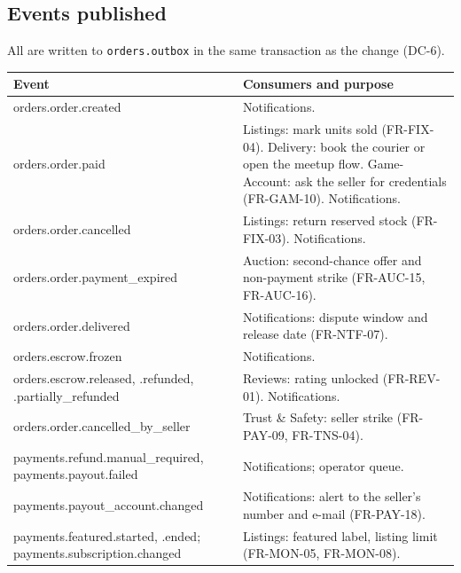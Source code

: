 \documentclass[11pt,a4paper]{article}
\newenvironment{dtable}[1]{\small\begin{longtable}{#1}}{\end{longtable}}
\begin{document}
\subsection{Events published}
All are written to \texttt{orders.outbox} in the same transaction as the change (DC-6).
\begin{dtable}{@{}>{\ttfamily}p{6.0cm}>{\raggedright\arraybackslash}p{9.2cm}@{}}
\toprule
\textnormal{\textbf{Event}} & \textbf{Consumers and purpose} \\ \midrule \endhead
orders.order.created & Notifications. \\
orders.order.paid & Listings: mark units sold (FR-FIX-04). Delivery: book the courier or open the meetup flow. Game-Account: ask the seller for credentials (FR-GAM-10). Notifications. \\
orders.order.cancelled & Listings: return reserved stock (FR-FIX-03). Notifications. \\
orders.order.\allowbreak payment\_expired & Auction: second-chance offer and non-payment strike (FR-AUC-15, FR-AUC-16). \\
orders.order.delivered & Notifications: dispute window and release date (FR-NTF-07). \\
orders.escrow.frozen & Notifications. \\
orders.escrow.\allowbreak released, .refunded, .partially\_refunded & Reviews: rating unlocked (FR-REV-01). Notifications. \\
orders.order.\allowbreak cancelled\_by\_seller & Trust \& Safety: seller strike (FR-PAY-09, FR-TNS-04). \\
payments.refund.\allowbreak manual\_required, payments.payout.\allowbreak failed & Notifications; operator queue. \\
payments.payout\_account.changed & Notifications: alert to the seller's number and e-mail (FR-PAY-18). \\
payments.featured.\allowbreak started, .ended; payments.\allowbreak subscription.\allowbreak changed & Listings: featured label, listing limit (FR-MON-05, FR-MON-08). \\
\bottomrule
\end{dtable}
\end{document}
